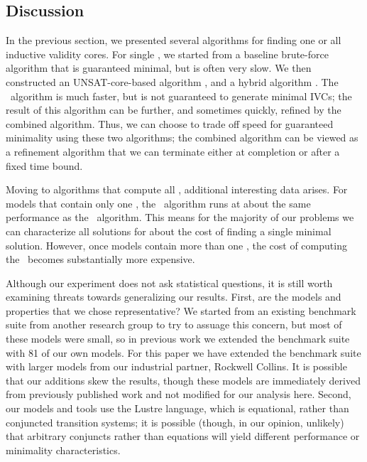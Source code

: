 
\subsection{Discussion}

In the previous section, we presented several algorithms for finding
one or all inductive validity cores.  For single \mivcs, we started from a baseline brute-force algorithm that is guaranteed minimal, but is often very slow.  We then constructed an UNSAT-core-based algorithm \ucalg, and a hybrid algorithm \ucbfalg.
The \ucalg\ algorithm is much faster, but is
not guaranteed to generate minimal IVCs; the result of this algorithm can be
further, and sometimes quickly, refined by the combined algorithm.
Thus, we can choose to trade off speed for guaranteed minimality using
these two algorithms; the combined algorithm can be viewed as a
refinement algorithm that we can terminate either at completion or
after a fixed time bound.

Moving to algorithms that compute all \mivcs, additional interesting data arises.  For models that contain only one \mivc, the \aivcalg\ algorithm runs at about the same performance as the \ucbfalg\ algorithm.  This means for the majority of our problems we can characterize all solutions for about the cost of finding a single minimal solution.  However, once models contain more than one \mivc, the cost of computing the \aivcalg\ becomes substantially more expensive.


Although our experiment does not ask statistical questions, it is still worth examining threats towards generalizing our results.  First, are the models and properties that we chose representative?  We started from an existing benchmark suite from another research group to try to assuage this concern, but most of these models were small, so in previous work we extended the benchmark suite with 81 of our own models.  For this paper we have extended the benchmark suite with larger models from our industrial partner, Rockwell Collins.  It is possible that our additions skew the results, though these models are immediately derived from previously published work and not modified for our analysis here.  Second, our models and tools use the Lustre language, which is equational, rather than conjuncted transition systems; it is possible (though, in our opinion, unlikely) that arbitrary conjuncts rather than equations will yield different performance or minimality characteristics.

